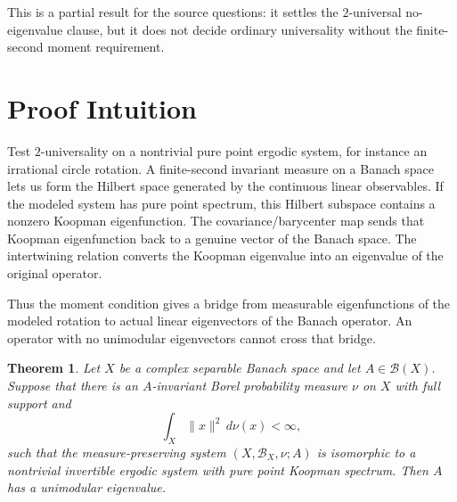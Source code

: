 \documentclass[11pt]{article}
\newtheorem{theorem}{Theorem}
\newcommand{\B}{\mathcal B}
\begin{document}
This is a partial result for the source questions: it settles the $2$-universal no-eigenvalue clause, but it does not decide ordinary universality without the finite-second moment requirement.

\section*{Proof Intuition}

Test $2$-universality on a nontrivial pure point ergodic system, for instance an irrational circle rotation. A finite-second invariant measure on a Banach space lets us form the Hilbert space generated by the continuous linear observables. If the modeled system has pure point spectrum, this Hilbert subspace contains a nonzero Koopman eigenfunction. The covariance/barycenter map sends that Koopman eigenfunction back to a genuine vector of the Banach space. The intertwining relation converts the Koopman eigenvalue into an eigenvalue of the original operator.

Thus the moment condition gives a bridge from measurable eigenfunctions of the modeled rotation to actual linear eigenvectors of the Banach operator. An operator with no unimodular eigenvectors cannot cross that bridge.

\begin{theorem}
\label{thm:pure-point-test}
Let $X$ be a complex separable Banach space and let $A\in\B(X)$. Suppose that there is an $A$-invariant Borel probability measure $\nu$ on $X$ with full support and
\[
  \int_X \|x\|^2\,d\nu(x)<\infty,
\]
such that the measure-preserving system $(X,\B_X,\nu;A)$ is isomorphic to a nontrivial invertible ergodic system with pure point Koopman spectrum. Then $A$ has a unimodular eigenvalue.
\end{theorem}
\end{document}
